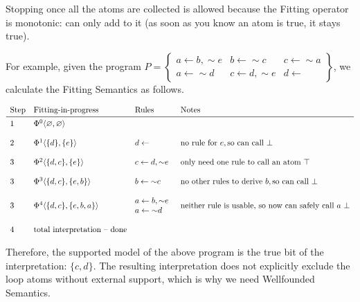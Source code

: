 \documentclass[9pt,a4paper,landscape]{article}
\begin{document}
{Stopping once all the atoms are collected is allowed because the Fitting operator is monotonic: can only add to it (as soon as you know an atom is true, it stays true).

For example, given the program $P = \left\{\begin{array}{lll}
a \leftarrow b, {\sim} e & b \leftarrow {\sim} c & c \leftarrow {\sim} a \\
a \leftarrow {\sim} d & c \leftarrow d, {\sim} e & d \leftarrow
\end{array}\right\}$, we calculate the Fitting Semantics as follows.

\begin{center}
	$\begin{array}{llll}
\text{Step} & \text{Fitting-in-progress} & \text{Rules} & \text{Notes} \\ \midrule
1 & \Phi^0 \langle \varnothing, \varnothing \rangle && \\&\\
2 & \Phi^1 \langle \{d\}, \{e\} \rangle & d \leftarrow & \text{no rule for}\ e, \text{so can call}\ \bot\\&\\
3 & \Phi^2 \langle \{d, c\}, \{e\} \rangle & c \leftarrow d, {\sim} e & \text{only need one rule to call an atom}\ \top \\&\\
3 & \Phi^3 \langle \{d, c\}, \{e, b\} \rangle & b \leftarrow {\sim} c & \text{no other rules to derive}\ b, \text{so can call}\ \bot \\&\\
3 & \Phi^4 \langle \{d, c\}, \{e, b, a\} \rangle & \begin{array}{@{}l}
a \leftarrow b, {\sim} e\\
a \leftarrow {\sim} d
\end{array} & \text{neither rule is usable, so now can safely call}\ a\ \bot \\ &\\
4 & \text{total interpretation -- done}
\end{array}$
\end{center}

Therefore, the supported model of the above program is the true bit of the interpretation: $\{c, d\}$.
The resulting interpretation does not explicitly exclude the loop atoms without external support, which is why we need Wellfounded Semantics.


}
\end{document}

